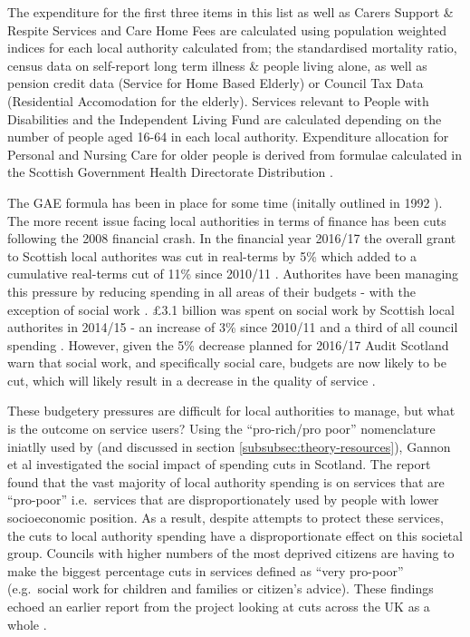\documentclass[12pt,]{report}
\begin{document}
The expenditure for the first three items in this list as well as Carers
Support \& Respite Services and Care Home Fees are calculated using
population weighted indices for each local authority calculated from;
the standardised mortality ratio, census data on self-report long term
illness \& people living alone, as well as pension credit data (Service
for Home Based Elderly) or Council Tax Data (Residential Accomodation
for the elderly). Services relevant to People with Disabilities and the
Independent Living Fund are calculated depending on the number of people
aged 16-64 in each local authority. Expenditure allocation for Personal
and Nursing Care for older people is derived from formulae calculated in
the Scottish Government Health Directorate Distribution \citep{RN450}.

The GAE formula has been in place for some time (initally outlined in
1992 \citep{RN450}). The more recent issue facing local authorities in
terms of finance has been cuts following the 2008 financial crash. In
the financial year 2016/17 the overall grant to Scottish local
authorites was cut in real-terms by 5\% which added to a cumulative
real-terms cut of 11\% since 2010/11 \citep{RN447}. Authorites have been
managing this pressure by reducing spending in all areas of their
budgets - with the exception of social work \citep{RN447}. £3.1 billion
was spent on social work by Scottish local authorites in 2014/15 - an
increase of 3\% since 2010/11 and a third of all council spending
\citep{RN446}. However, given the 5\% decrease planned for 2016/17 Audit
Scotland \citeyearpar{RN447} warn that social work, and specifically
social care, budgets are now likely to be cut, which will likely result
in a decrease in the quality of service \citep{RN446}.

These budgetery pressures are difficult for local authorities to manage,
but what is the outcome on service users? Using the ``pro-rich/pro
poor'' nomenclature iniatlly used by \citep{RN440} (and discussed in
section \ref{subsubsec:theory-resources}), Gannon et al
\citeyearpar{RN235} investigated the social impact of spending cuts in
Scotland. The report found that the vast majority of local authority
spending is on services that are ``pro-poor'' i.e.~services that are
disproportionately used by people with lower socioeconomic position. As
a result, despite attempts to protect these services, the cuts to local
authority spending have a disproportionate effect on this societal
group. Councils with higher numbers of the most deprived citizens are
having to make the biggest percentage cuts in services defined as ``very
pro-poor'' (e.g.~social work for children and families or citizen's
advice). These findings echoed an earlier report from the project
looking at cuts across the UK as a whole \citep{RN117}.
\end{document}
